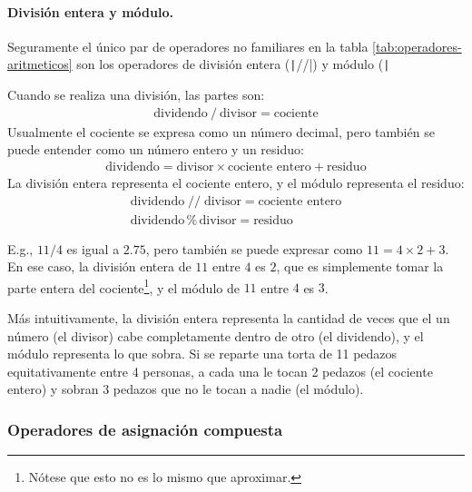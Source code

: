 \paragraph{División entera y módulo.} Seguramente el único par de operadores no familiares en la tabla \ref{tab:operadores-aritmeticos} son los operadores de división entera (\texttt|//|) y módulo (\texttt|%

Cuando se realiza una división, las partes son:
\begin{gather*}
  \text{dividendo} \operatorname{\texttt{/}} \text{divisor} = \text{cociente}
\end{gather*}
Usualmente el cociente se expresa como un número decimal, pero también se puede entender como un número entero y un residuo:
\begin{gather*}
  \text{dividendo} = \text{divisor} \times \text{cociente entero} + \text{residuo}
\end{gather*}
La división entera representa el cociente entero, y el módulo representa el residuo:
\begin{gather*}
  \text{dividendo} \operatorname{\texttt{//}} \text{divisor} = \text{cociente entero} \\
  \text{dividendo} \operatorname{\texttt{\%}} \text{divisor} = \text{residuo}
\end{gather*}

E.g., $11 / 4$ es igual a $2.75$, pero también se puede expresar como $11 = 4 \times 2 + 3$. En ese caso, la división entera de $11$ entre $4$ es $2$, que es simplemente tomar la parte entera del cociente\footnote{Nótese que esto no es lo mismo que aproximar.}, y el módulo de $11$ entre $4$ es $3$. 

Más intuitivamente, la división entera representa la cantidad de veces que el un número (el divisor) cabe completamente dentro de otro (el dividendo), y el módulo representa lo que sobra. Si se reparte una torta de 11 pedazos equitativamente entre 4 personas, a cada una le tocan 2 pedazos (el cociente entero) y sobran 3 pedazos que no le tocan a nadie (el módulo).

\subsubsection{Operadores de asignación compuesta}

